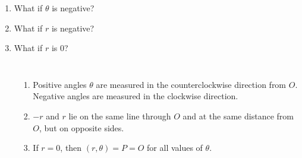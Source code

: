 \begin{frame}
\begin{enumerate}
\item<1-| alert@2>  What if $\theta$ is negative?
\item<1-| alert@3>  What if $r$ is negative?
\item<1-| alert@4>  What if $r$ is $0$?
\end{enumerate}
\begin{columns}[c]
\ %
\ %
\begin{enumerate}
\item<2-| alert@2>  Positive angles $\theta$ are measured in the counterclockwise direction from $O$.  Negative angles are measured in the clockwise direction.
\item<3-| alert@3>  $-r$ and $r$ lie on the same line through $O$ and at the same distance from $O$, but on opposite sides.
\item<4-| alert@4>  If $r = 0$, then $(r, \theta) = P = O$ for all values of $\theta$.
\end{enumerate}
\end{columns}
\end{frame}

